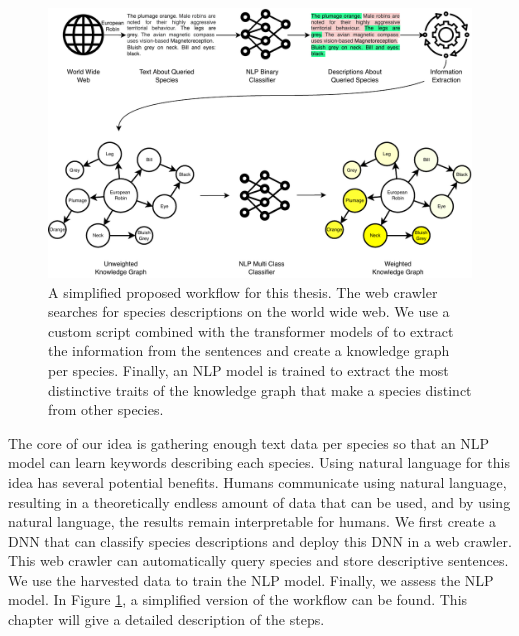 \documentclass[a4paper, 12pt, oneside]{book} %
\begin{document}
\begin{figure} [htpb]
    \centering
    \includegraphics[width=\textwidth]{figures/workflow.pdf}
    \caption[Proposed Workflow]{A simplified proposed workflow for this thesis. The web crawler searches for species descriptions on the world wide web. We use a custom script combined with the transformer models of \textcite{wolf_huggingfaces_2020} to extract the information from the sentences and create a knowledge graph per species. Finally, an NLP model is trained to extract the most distinctive traits of the knowledge graph that make a species distinct from other species.}
    \label{fig:workflow}
\end{figure}

The core of our idea is gathering enough text data per species so that an NLP model can learn keywords describing each species.
Using natural language for this idea has several potential benefits.
Humans communicate using natural language, resulting in a theoretically endless amount of data that can be used, and by using natural language, the results remain interpretable for humans.
We first create a DNN that can classify species descriptions and deploy this DNN in a web crawler.
This web crawler can automatically query species and store descriptive sentences.
We use the harvested data to train the NLP model.
Finally, we assess the NLP model.
In Figure \ref{fig:workflow}, a simplified version of the workflow can be found.
This chapter will give a detailed description of the steps.
\end{document}
